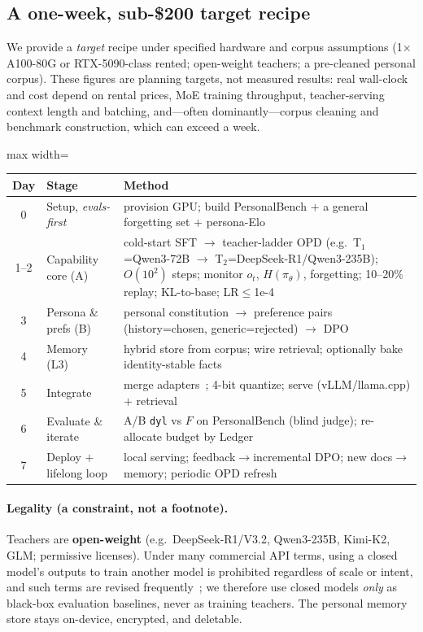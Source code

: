 \documentclass[11pt]{article}
\begin{document}
\subsection{A one-week, sub-\$200 target recipe}
We provide a \emph{target} recipe under specified hardware and corpus assumptions (1$\times$A100-80G or RTX-5090-class rented; open-weight teachers; a pre-cleaned personal corpus). These figures are planning targets, not measured results: real wall-clock and cost depend on rental prices, MoE training throughput, teacher-serving context length and batching, and---often dominantly---corpus cleaning and benchmark construction, which can exceed a week.
\begin{center}\small
\begin{adjustbox}{max width=\linewidth}
\begin{tabular}{@{}clp{7.0cm}@{}}
\toprule
\textbf{Day} & \textbf{Stage} & \textbf{Method} \\
\midrule
0 & Setup, \emph{evals-first} & provision GPU; build PersonalBench $+$ a general forgetting set $+$ persona-Elo \\
1--2 & Capability core (A) & cold-start SFT $\to$ teacher-ladder OPD (e.g.\ T$_1$=Qwen3-72B $\to$ T$_2$=DeepSeek-R1/Qwen3-235B); $O(10^2)$ steps; monitor $o_t$, $H(\pi_\theta)$, forgetting; 10--20\% replay; KL-to-base; LR$\le$1e-4 \\
3 & Persona \& prefs (B) & personal constitution $\to$ preference pairs (history=chosen, generic=rejected) $\to$ DPO \\
4 & Memory (L3) & hybrid store from corpus; wire retrieval; optionally bake identity-stable facts \\
5 & Integrate & merge adapters~\cite{ilharco2023task,yadav2023ties}; 4-bit quantize; serve (vLLM/llama.cpp) $+$ retrieval \\
6 & Evaluate \& iterate & A/B \texttt{dyl} vs $F$ on PersonalBench (blind judge); re-allocate budget by Ledger \\
7 & Deploy $+$ lifelong loop & local serving; feedback$\to$incremental DPO; new docs$\to$memory; periodic OPD refresh \\
\bottomrule
\end{tabular}
\end{adjustbox}
\end{center}

\paragraph{Legality (a constraint, not a footnote).} Teachers are \textbf{open-weight} (e.g.\ DeepSeek-R1/V3.2, Qwen3-235B, Kimi-K2, GLM; permissive licenses). Under many commercial API terms, using a closed model's outputs to train another model is prohibited regardless of scale or intent, and such terms are revised frequently~\cite{tos}; we therefore use closed models \emph{only} as black-box evaluation baselines, never as training teachers. The personal memory store stays on-device, encrypted, and deletable.
\end{document}
